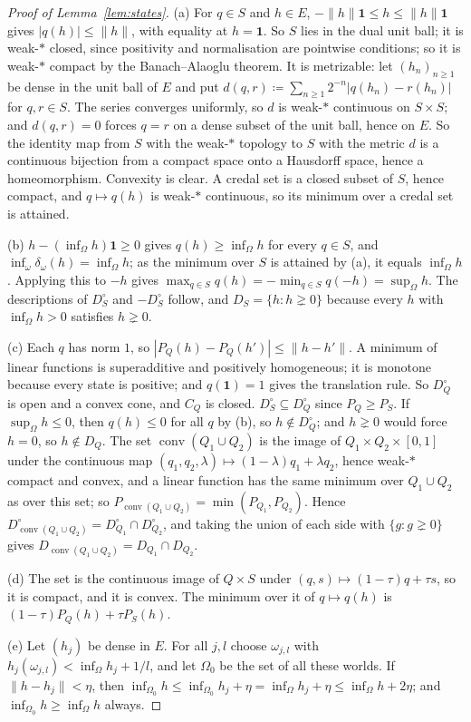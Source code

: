 \documentclass[11pt]{article}
\newcommand{\one}{\mathbf{1}}
\DeclareMathOperator{\conv}{conv}
\theoremstyle{plain}
\theoremstyle{definition}
\begin{document}
\begin{proof}[Proof of Lemma~\ref{lem:states}]
(a) For $q\in S$ and $h\in E$, $-\|h\|\one\le h\le\|h\|\one$ gives $|q(h)|\le\|h\|$, with
equality at $h=\one$. So $S$ lies in the dual unit ball; it is weak-$\ast$ closed, since
positivity and normalisation are pointwise conditions; so it is weak-$\ast$ compact by the
Banach--Alaoglu theorem. It is metrizable: let $(h_n)_{n\ge1}$ be dense in the unit ball of $E$
and put $d(q,r)\coloneqq\sum_{n\ge1}2^{-n}|q(h_n)-r(h_n)|$ for $q,r\in S$. The series converges
uniformly, so $d$ is weak-$\ast$ continuous on $S\times S$; and $d(q,r)=0$ forces $q=r$ on a
dense subset of the unit ball, hence on $E$. So the identity map from $S$ with the weak-$\ast$
topology to $S$ with the metric $d$ is a continuous bijection from a compact space onto a
Hausdorff space, hence a homeomorphism. Convexity is clear. A credal set is a closed subset of
$S$, hence compact, and $q\mapsto q(h)$ is weak-$\ast$ continuous, so its minimum over a credal
set is attained.

(b) $h-(\inf_\Omega h)\one\ge0$ gives $q(h)\ge\inf_\Omega h$ for every $q\in S$, and
$\inf_{\omega}\delta_\omega(h)=\inf_\Omega h$; as the minimum over $S$ is attained by (a), it
equals $\inf_\Omega h$. Applying this to $-h$ gives $\max_{q\in S}q(h)=-\min_{q\in S}q(-h)=
\sup_\Omega h$. The descriptions of $D_S^\circ$ and $-D_S^\circ$ follow, and $D_S=\{h:h\gneq0\}$
because every $h$ with $\inf_\Omega h>0$ satisfies $h\gneq0$.

(c) Each $q$ has norm $1$, so $|P_Q(h)-P_Q(h')|\le\|h-h'\|$. A minimum of linear functions is
superadditive and positively homogeneous; it is monotone because every state is positive; and
$q(\one)=1$ gives the translation rule. So $D_Q^\circ$ is open and a convex cone, and $C_Q$ is
closed. $D_S^\circ\subseteq D_Q^\circ$ since $P_Q\ge P_S$. If $\sup_\Omega h\le0$, then $q(h)\le0$
for all $q$ by (b), so $h\notin D_Q^\circ$; and $h\gneq0$ would force $h=0$, so $h\notin D_Q$.
The set $\conv(Q_1\cup Q_2)$ is the image of $Q_1\times Q_2\times[0,1]$ under the
continuous map $(q_1,q_2,\lambda)\mapsto(1-\lambda)q_1+\lambda q_2$, hence weak-$\ast$ compact
and convex, and a linear function has the same minimum over $Q_1\cup Q_2$ as over this set; so
$P_{\conv(Q_1\cup Q_2)}=\min(P_{Q_1},P_{Q_2})$. Hence $D^\circ_{\conv(Q_1\cup Q_2)}=
D^\circ_{Q_1}\cap D^\circ_{Q_2}$, and taking the union of each side with $\{g:g\gneq0\}$ gives
$D_{\conv(Q_1\cup Q_2)}=D_{Q_1}\cap D_{Q_2}$.

(d) The set is the continuous image of $Q\times S$ under $(q,s)\mapsto(1-\tau)q+\tau s$, so it
is compact, and it is convex. The minimum over it of $q\mapsto q(h)$ is $(1-\tau)P_Q(h)+\tau
P_S(h)$.

(e) Let $(h_j)$ be dense in $E$. For all $j,l$ choose $\omega_{j,l}$ with $h_j(\omega_{j,l})<
\inf_\Omega h_j+1/l$, and let $\Omega_0$ be the set of all these worlds. If $\|h-h_j\|<\eta$,
then $\inf_{\Omega_0}h\le\inf_{\Omega_0}h_j+\eta=\inf_\Omega h_j+\eta\le\inf_\Omega h+2\eta$;
and $\inf_{\Omega_0}h\ge\inf_\Omega h$ always.
\end{proof}
\end{document}
